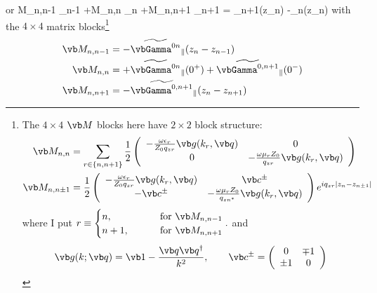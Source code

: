 \documentclass[letterpaper]{article}
\renewcommand{\wt}{\widetilde}
\begin{document}
or
{
  \vb M_{n,n-1}  \cdot \wt{\bmc S}_{n-1}
 +\vb M_{n,n}    \cdot \wt{\bmc S}_{n}
 +\vb M_{n,n+1}  \cdot \wt{\bmc S}_{n+1}
 =  \wt{\bmc F}_{n+1\parallel}(z_n)
   -\wt{\bmc F}_{n\parallel}(z_n)
}
with the $4\times 4$ matrix blocks\footnote{The $4\times 4$ $\vb M$
blocks here have $2\times 2$ block structure:
\begin{align}
 \vb M_{n, n}
   &= \sum_{r\in \{n, n+1\}}
     \frac{1}{2}
     \left(\begin{array}{cc}
     -\frac{\omega\epsilon_r}{Z_0 q_{zr}}\vb g(k_r, \vb q)
   & 0
 \\
     0
   & -\frac{\omega\mu_r Z_0 }{q_{zr}}\vb g(k_r, \vb q)
   \end{array}\right)
\\
 \vb M_{n, n \pm 1}
   &= \frac{1}{2}
     \left(\begin{array}{cc}
     -\frac{\omega\epsilon_r}{Z_0 q_{zr}}\vb g(k_r, \vb q)
   & \vb c^\pm
 \\
     -\vb  c^\pm
   & -\frac{\omega\mu_r Z_0 }{q_{zn^*}}\vb g(k_r, \vb q)
     \end{array}\right)e^{iq_{zr}|z_n-z_{n\pm 1}|}
\end{align}
where I put
$  r \equiv  \begin{cases} n,   \qquad &\text{ for } \vb M_{n,n-1} \\
                           n+1, \qquad &\text{ for } \vb M_{n,n+1}
              \end{cases}.
$
and 
$$ \vb g(k; \vb q) =
   \vb 1 - \frac{\vb q\vb q^\dagger}{k^2},
   \qquad 
   \vb c^\pm
   =\left(\begin{array}{cc} 0 & \mp 1 \\ \pm 1 & 0 \end{array}\right)
$$}
\begin{subequations}
\begin{align}
  \vb M_{n,n-1} &= -\wt{\vbGamma^{0n}}_{\parallel}(z_n-z_{n-1}) 
\\
  \vb M_{n,n} &= +\wt{\vbGamma^{0n}}_{\parallel}(0^+)
                 +\wt{\vbGamma^{0,n+1}}_{\parallel}(0^-)
\\
  \vb M_{n,n+1} &= -\wt{\vbGamma^{0,n+1}}_{\parallel}(z_n-z_{n+1}) 
\end{align}
\label{MChunks}%
\end{subequations}
\end{document}
